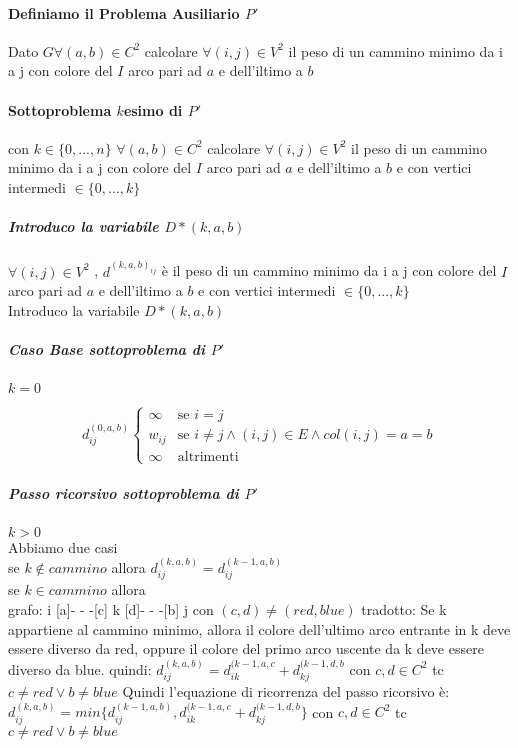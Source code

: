 \documentclass[12pt, a4paper, openany]{book}
\begin{document}
	\paragraph{Definiamo il Problema Ausiliario $P'$}
	Dato $G \forall(a,b) \in C^2$ calcolare $\forall(i,j) \in V^2$ il peso di un cammino minimo da i a j con
	colore del $I$ arco pari ad $a$ e dell'iltimo a $b$

	\paragraph{Sottoproblema $k$esimo di $P'$} con $k \in \{0,...,n\}$
$\forall(a,b) \in C^2$ calcolare $\forall(i,j) \in V^2$ il peso di un cammino minimo da i a j con
	colore del $I$ arco pari ad $a$ e dell'iltimo a $b$ e con vertici intermedi $\in \{0,...,k\}$\\
	\subparagraph{Introduco la variabile $D*{(k,a,b)}$}
$\forall(i,j)\in V^2$ , $d^{(k,a,b)_{ij}}$ è il peso di un cammino minimo da i a j  con
	colore del $I$ arco pari ad $a$ e dell'iltimo a $b$ e con vertici intermedi $\in \{0,...,k\}$\\
	Introduco la variabile $D*{(k,a,b)}$
	\subparagraph{Caso Base sottoproblema di $P'$} $k = 0$

	\begin{equation*}
		d^{(0,a,b)}_{ij} \begin{cases}
			\infty & \text{se $i=j$}                                             \\
			w_{ij} & \text{se $i\neq j \land (i,j)\in E \land col(i,j) = a = b$} \\
			\infty & \text{altrimenti}
		\end{cases}
	\end{equation*}

	\subparagraph{Passo ricorsivo sottoproblema di $P'$} $k > 0$\\
	Abbiamo due casi\\
	se $k \notin cammino$ allora $d^{(k,a,b)}_{ij} = d^{(k-1,a,b)}_{ij}$\\
	se $k \in cammino$ allora \\
	grafo: i [a]- - -[c] k [d]- - -[b] j con $(c,d) \neq (red,blue)$
	tradotto: Se k appartiene al cammino minimo, allora il colore dell'ultimo arco entrante in k deve essere diverso da red, oppure il colore del primo arco uscente da k deve essere diverso da blue.
	quindi: $d^{(k,a,b)}_{ij} = d^{(k-1,a,c}_{ik} + d^{(k-1,d,b}_{kj}$ con $c,d \in C^2$ tc $c\neq red \vee b\neq blue$
	Quindi l'equazione di ricorrenza del passo ricorsivo è:\\
$d^{(k,a,b)}_{ij} = min\{d^{(k-1,a,b)}_{ij} ,d^{(k-1,a,c}_{ik} + d^{(k-1,d,b}_{kj}\}$ con $c,d \in C^2$ tc $c\neq red \vee b\neq blue$
\end{document}
